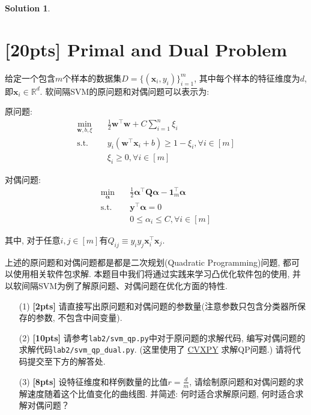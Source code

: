 \documentclass[a4paper,UTF8]{article}
\numberwithin{equation}{section}
\theoremstyle{definition}
\newtheorem*{solution}{Solution}
\newcommand{\vct}[1]{\boldsymbol{#1}} %
\newcommand{\vw}{\vct{w}}
\newcommand{\vx}{\vct{x}}
\newcommand{\vy}{\vct{y}}
\newcommand{\ones}{\vct{1}}
\newcommand{\mat}[1]{\boldsymbol{#1}} %
\begin{document}
\begin{solution}
\end{solution}
\newpage

\section{[20pts] Primal and Dual Problem}
给定一个包含$m$个样本的数据集$D=\{(\vx_i, y_i)\}_{i=1}^{m}$, 其中每个样本的特征维度为$d$, 即$\vx_i \in \mathbb{R}^d$. 软间隔SVM的原问题和对偶问题可以表示为: 
\vspace{8pt}

\begin{minipage}{0.5\textwidth}
原问题:
$$
\begin{aligned}
\min_{\vw, b, \xi} \quad & \frac{1}{2} \vw^{\top} \vw+C \sum_{i=1}^{n} \xi_{i} \\
\text {s.t.}\quad & y_{i}\left(\vw^{\top} \vx_{i}+b\right) \geq 1-\xi_{i}, \forall i \in [m]\\
\quad &\xi_{i} \geq 0, \forall i \in [m]
\end{aligned}
$$
\end{minipage}
\begin{minipage}{0.5\textwidth}
对偶问题:
$$
\begin{aligned}
\min_{\bm{\alpha}}\quad &  \frac{1}{2} \bm{\alpha}^{\top} \mat{Q} \bm{\alpha}-\ones_m^{\top} \bm{\alpha} \\
\text {s.t.}\quad &  \vy^{\top} \bm{\alpha}=0 \\
\quad & 0 \leq \alpha_{i} \leq C, \forall i \in [m]
\end{aligned}
$$
\end{minipage}

\vspace{5pt}
其中, 对于任意$i, j \in [m]$有$Q_{i j} \equiv y_{i} y_{j} \vx^\top_i \vx_j$. 
\vspace{5pt}

上述的原问题和对偶问题都是都是二次规划(Quadratic Programming)问题, 都可以使用相关软件包求解. 本题目中我们将通过实践来学习凸优化软件包的使用, 并以软间隔SVM为例了解原问题、对偶问题在优化方面的特性.

\begin{enumerate}
    \item[(1)] \textbf{[2pts]} 请直接写出原问题和对偶问题的参数量(注意参数只包含分类器所保存的参数, 不包含中间变量).
    \item[(2)] \textbf{[10pts]} 请参考\texttt{lab2/svm\_qp.py}中对于原问题的求解代码, 编写对偶问题的求解代码\texttt{lab2/svm\_qp\_dual.py}. (这里使用了 \href{https://www.cvxpy.org/}{CVXPY} 求解QP问题.) 请将代码提交至下方的解答处.
    \item[(3)] \textbf{[8pts]} 设特征维度和样例数量的比值$r = \frac{d}{m}$, 请绘制原问题和对偶问题的求解速度随着这个比值变化的曲线图. 并简述: 何时适合求解原问题, 何时适合求解对偶问题？
\end{enumerate}
\end{document}
